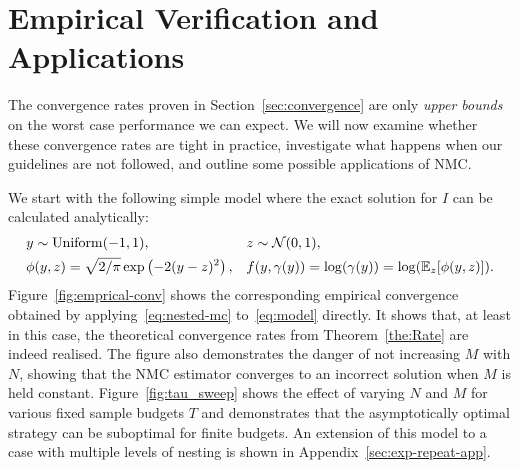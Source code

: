 
\section{Empirical Verification and Applications}
\label{sec:empirical}

The convergence rates proven in Section~\ref{sec:convergence} are only
\emph{upper bounds} on the worst case performance we can expect. We will now
examine whether these convergence rates are tight in practice, investigate what happens
when our guidelines are not followed, and outline some possible applications of NMC. 

We start with the following simple model where the exact solution for $I$
can be calculated analytically:
\begin{equation}
\begin{aligned}
\label{eq:model}
& y \sim \mathrm{Uniform}(-1,1), &&
z \sim \mathcal{N}(0,1), \\
& \phi(y,z) = \sqrt{2/\pi}\exp\left(-2(y-z)^2\right), &&
f(y,\gamma(y)) = \log (\gamma (y)) = \log(\mathbb{E}_z[\phi(y,z)]).
\end{aligned}
\end{equation}
Figure~\ref{fig:emprical-conv} shows the corresponding empirical convergence obtained by
applying~\eqref{eq:nested-mc} to~\eqref{eq:model} directly. It shows that, at least in
this case, the theoretical convergence rates from Theorem~\ref{the:Rate} are indeed
realised. The figure also demonstrates the danger of not increasing
$M$ with $N$, showing that the NMC estimator converges to an incorrect solution when $M$
is held constant.  Figure~\ref{fig:tau_sweep} shows the effect of varying $N$ and $M$ for various
fixed sample budgets $T$ and demonstrates that the asymptotically optimal strategy can be suboptimal
for finite budgets.  An extension of this model to a case with multiple levels of nesting is
shown in Appendix~\ref{sec:exp-repeat-app}.

